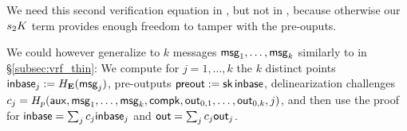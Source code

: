 We need this second verification equation in \PedVRF, but not in \ThinVRF,
because otherwise our $s_2 K$ term provides enough freedom to tamper
with the pre-ouputs.  

We could however generalize \PedVRF to $k$ messages $\mathsf{msg}_1,\ldots,\mathsf{msg}_k$
similarly to \ThinVRF in \S\ref{subsec:vrf_thin}:  We compute for
$j=1,\ldots,k$ the $k$ distinct
points ${\mathsf{inbase}}_j := H_{{\mathbf{E}}}(\mathsf{msg}_j)$, pre-outputs ${\mathsf{preout}} := \mathsf{sk} \, {\mathsf{inbase}}$,
delinearization challenges
 $c_j = H_p(\mathsf{aux},\mathsf{msg}_1,\ldots,\mathsf{msg}_k,\mathsf{compk},{\mathsf{out}}_{0,1},\ldots,{\mathsf{out}}_{0,k},j)$,
and then use the \PedVRF proof for
 ${\mathsf{inbase}} = \sum_j c_j {\mathsf{inbase}}_j$ and ${\mathsf{out}} = \sum_j c_j {\mathsf{out}}_j$.








